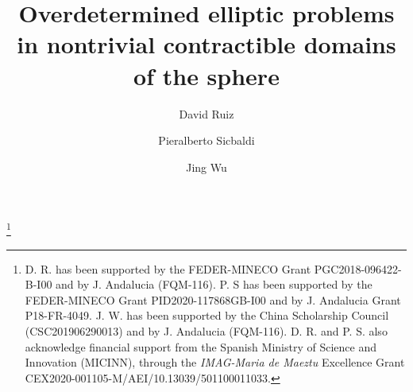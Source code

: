 \documentclass[reqno]{amsart}
\numberwithin{equation}{section}
\newenvironment{key words}{\textbf{Keywords}\mbox{  }}{ }
\begin{document}
\title{Overdetermined elliptic problems in nontrivial contractible domains of the sphere}


\author{David Ruiz}
\address{(D.~Ruiz)
	IMAG, Departamento de An\'alisis matem\'atico, Universidad de Granada,
	Campus Fuente-nueva, 18071 Granada, Spain} 
%

\author{Pieralberto Sicbaldi}
\address{(P.~Sicbaldi)
	Departamento de An\'alisis matem\'atico,
	Universidad de Granada,
	Campus Fuentenueva,
	18071 Granada,
	Spain \& Aix Marseille Universit\'e - CNRS, Centrale Marseille - I2M, Marseille, France}
%

\author{Jing Wu}
\address{(J.~Wu)
	Departamento de An\'alisis matem\'atico, Universidad de Granada,
	Campus Fuente-nueva, 18071 Granada, Spain} 
%

\thanks{D. R. has been supported by the FEDER-MINECO Grant PGC2018-096422-B-I00 and by J. Andalucia (FQM-116).
 P. S has been supported by the FEDER-MINECO Grant PID2020-117868GB-I00 and by J. Andalucia Grant P18-FR-4049. J. W. has been supported
by the China Scholarship Council (CSC201906290013) and by J. Andalucia (FQM-116).
D. R. and P. S. also acknowledge financial support from the Spanish Ministry of Science and Innovation (MICINN), through the \emph{IMAG-Maria de Maeztu} Excellence Grant CEX2020-001105-M/AEI/10.13039/501100011033.}
\maketitle
\end{document}
